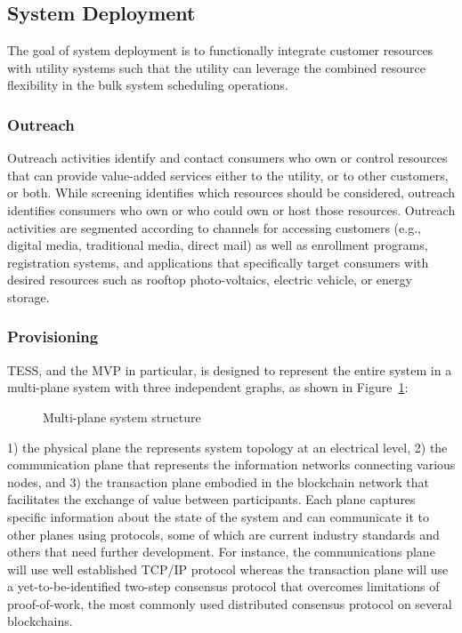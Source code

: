 \subsection{System Deployment}

The goal of system deployment is to functionally integrate customer resources with utility systems such that the utility can leverage the combined resource flexibility in the bulk system scheduling operations.

\subsubsection{Outreach}

Outreach activities identify and contact consumers who own or control resources that can provide value-added services either to the utility, or to other customers, or both. While screening identifies which resources should be considered, outreach identifies consumers who own or who could own or host those resources. Outreach activities are segmented according to  channels for accessing customers (e.g., digital media, traditional media, direct mail) as well as enrollment programs, registration systems, and applications that specifically target consumers with desired resources such as rooftop photo-voltaics, electric vehicle, or energy storage. 

\subsubsection{Provisioning}

TESS, and the MVP in particular, is designed to represent the entire system in a multi-plane system with three independent graphs, as shown in Figure~\ref{fig:planes}: 
\begin{figure}[!t]
    \centering
    \caption{Multi-plane system structure}
    \label{fig:planes}
\end{figure}
1) the physical plane the represents system topology at an electrical level, 2) the communication plane that represents the information networks connecting various nodes, and 3) the transaction plane embodied in the blockchain network that facilitates the exchange of value between participants. Each plane captures specific information about the state of the system and can communicate it to other planes using protocols, some of which are current industry standards and others that need further development. For instance, the communications plane will use well established TCP/IP protocol whereas the transaction plane will use a yet-to-be-identified two-step consensus protocol that overcomes limitations of proof-of-work, the most commonly used distributed consensus protocol on several blockchains. 

